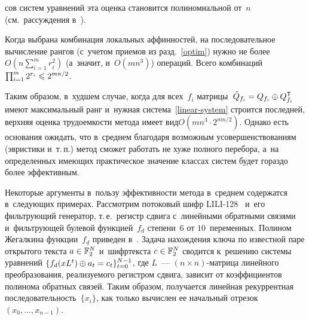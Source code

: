 \begin{multicols}{2}
\columnbreak

\noindent
сов систем уравнений эта 
оценка становится полиномиальной от~$n$ (см.\ рассуждения в~\cite{LSF2019}).

Когда выбрана комбинация локальных аффинностей, на последовательное вычисление 
рангов (с~учетом приемов из разд.~\ref{optim}) нужно не более $O(n\sum\nolimits_{i=1}^m 
r_i^2)$ (а~значит, и~$O(mn^3)$) операций.
Всего комбинаций $\prod\nolimits_{i=1}^m 2^{r_i}\hm\leqslant 2^{{mn}/{2}}$.

Таким образом, в~худшем случае, когда для всех~$f_i$ матрицы~$\tilde{Q}_{f_i}\hm=
Q_{f_i}\oplus Q_{f_i}^{\mathsf{T}}$ 
имеют максимальный ранг и~нужная система~\eqref{linear-system} строится 
последней, верхняя оценка трудоемкости метода имеет вид\linebreak $O(mn^3\cdot 2^{{mn}/{2}})$.
Однако есть основания ожидать, что в~среднем благодаря возможным 
усовершенствованиям (эвристики и~т.\,п.) метод сможет работать не хуже полного 
перебора, а~на определенных име\-ющих практическое значение классах сис\-тем будет 
гораздо более эффективным.

Некоторые аргументы в~пользу эффективности метода в~среднем содержатся 
в~следующих примерах.
Рассмотрим потоковый шифр LILI-128~\cite{SDGM2000} и~его фильтрующий генератор, 
т.\,е.\ регистр сдвига с~линейными обратными связями и~фильтрующей булевой 
функцией~$f_d$ степени~$6$ от $10$~переменных. Полином Жегалкина функции~$f_d$ 
приведен в~\cite{Log2008,LYaD2007}.
Задача нахождения ключа по известной паре открытого текста $a\hm\in\mathbb{F}_2^N$ 
и~шифртекста $c\hm\in\mathbb{F}_2^N$ сводится к~решению системы уравнений 
$\{f_d(xL^t)\oplus a_t\hm=c_t\}_{t=0}^{N-1}$, где $L$~--- $(n\times n)$-мат\-ри\-ца 
линейного преобразования, реализуемого регистром сдвига, зависит от 
коэффициентов полинома обратных связей.
Таким образом, получается линейная рекуррентная последовательность~$\{x_i\}$, 
как только вычислен ее начальный отрезок $(x_0,\ldots,x_{n-1})$.


\end{multicols}
